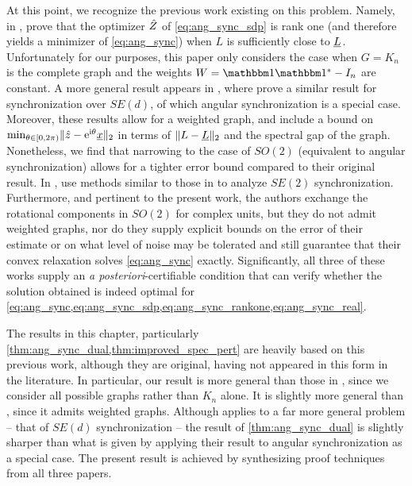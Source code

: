 At this point, we recognize the previous work existing on this problem.  Namely, in \cite{bandeira2016tightness}, \citeauthor*{bandeira2016tightness} prove that the optimizer $\hat{Z}$ of \eqref{eq:ang_sync_sdp} is rank one (and therefore yields a minimizer of \eqref{eq:ang_sync}) when $L$ is sufficiently close to $\underline{L}$.  Unfortunately for our purposes, this paper only considers the case when $G = K_n$ is the complete graph and the weights $W = \one \one^* - I_n$ are constant.  A more general result appears in \cite{bandeira2016se_sync}, where \citeauthor*{bandeira2016se_sync} prove a similar result for synchronization over $SE(d)$, of which angular synchronization is a special case.  Moreover, these results allow for a weighted graph, and include a bound on $\min_{\theta \in [0, 2\pi)} \lVert \hat{z} - \mathrm{e}^{\mathrm{i}\theta} \underline{x}\rVert_2$ in terms of $\lVert L - \underline{L} \rVert_2$ and the spectral gap of the graph.  Nonetheless, we find that narrowing to the case of $SO(2)$ (equivalent to angular synchronization) allows for a tighter error bound compared to their original result.  In \cite{calafiore2016complex_pgo}, \citeauthor*{calafiore2016complex_pgo} use methods similar to those in \cite{bandeira2016se_sync} to analyze $SE(2)$ synchronization.  Furthermore, and pertinent to the present work, the authors exchange the rotational components in $SO(2)$ for complex units, but they do not admit weighted graphs, nor do they supply explicit bounds on the error of their estimate or on what level of noise may be tolerated and still guarantee that their convex relaxation solves \eqref{eq:ang_sync} exactly.  Significantly, all three of these works supply an \emph{a posteriori}-certifiable condition that can verify whether the solution obtained is indeed optimal for \cref{eq:ang_sync,eq:ang_sync_sdp,eq:ang_sync_rankone,eq:ang_sync_real}.

The results in this chapter, particularly \cref{thm:ang_sync_dual,thm:improved_spec_pert} are heavily based on this previous work, although they are original, having not appeared in this form in the literature.  In particular, our result is more general than those in \cite{bandeira2016tightness}, since we consider all possible graphs rather than $K_n$ alone.  It is slightly more general than \cite{calafiore2016complex_pgo}, since it admits weighted graphs.  Although \cite{bandeira2016se_sync} applies to a far more general problem -- that of $SE(d)$ synchronization -- the result of \cref{thm:ang_sync_dual} is slightly sharper than what is given by applying their result to angular synchronization as a special case.  The present result is achieved by synthesizing proof techniques from all three papers. 

